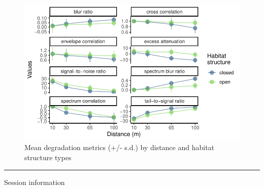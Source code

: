 \documentclass[
  letterpaper,
  DIV=11,
  numbers=noendperiod]{scrartcl}
\begin{document}
\begin{figure}

{\centering \includegraphics{Example-data-analysis-for-manuscript_files/figure-pdf/unnamed-chunk-27-1.pdf}

}

\caption{Mean degradation metrics (+/- s.d.) by distance and habitat
structure types}

\end{figure}

\begin{center}\rule{0.5\linewidth}{0.5pt}\end{center}

Session information
\end{document}
